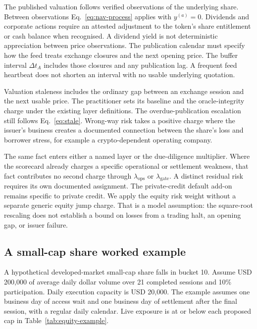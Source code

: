 The published valuation follows verified observations of the underlying share.
Between observations Eq.~\eqref{eq:nav-process} applies with $y^{(a)}=0$.
Dividends and corporate actions require an attested adjustment to the token's
share entitlement or cash balance when recognised. A dividend yield is not
deterministic appreciation between price observations. The publication calendar
must specify how the feed treats exchange closures and the next opening price.
The buffer interval $\Delta t_A$ includes those closures and any publication lag.
A frequent feed heartbeat does not shorten an interval with no usable underlying
quotation.

Valuation staleness includes the ordinary gap between an exchange session and
the next usable price. The practitioner sets its baseline and the oracle-integrity
charge under the existing layer definitions. The overdue-publication escalation
still follows Eq.~\eqref{eq:stale}. Wrong-way risk takes a positive charge where
the issuer's business creates a documented connection between the share's loss
and borrower stress, for example a crypto-dependent operating company.

The same fact enters either a named layer or the due-diligence multiplier.
Where the scorecard already charges a specific operational or settlement weakness,
that fact contributes no second charge through $\lambda_{\mathrm{ops}}$ or
$\lambda_{\mathrm{gate}}$. A distinct residual risk requires its own documented
assignment. The private-credit default add-on remains specific to private credit.
We apply the equity risk weight without a separate generic equity jump charge.
That is a model assumption: the square-root rescaling does not establish a bound
on losses from a trading halt, an opening gap, or issuer failure.

\subsection{A small-cap share worked example}\label{sec:equity-example}

A hypothetical developed-market small-cap share falls in bucket 10. Assume
USD 200{,}000 of average daily dollar volume over 21 completed sessions and
10\% participation. Daily execution capacity is USD 20{,}000. The example assumes
one business day of access wait and one business day of settlement after the final
session, with a regular daily calendar. Live exposure is at or below each proposed
cap in Table~\ref{tab:equity-example}.

